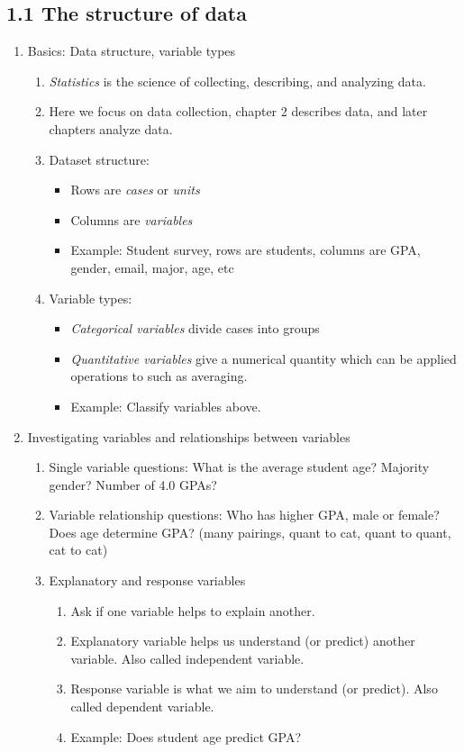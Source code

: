 \documentclass{article}
\begin{document}
\subsection{1.1 The structure of data}
\begin{enumerate}
\item Basics: Data structure, variable types
\begin{enumerate}
\item \emph{Statistics} is the science of collecting, describing, and analyzing data.
\item Here we focus on data collection, chapter 2 describes data, and later chapters analyze data.
\item Dataset structure:
\begin{itemize}
\item Rows are \emph{cases} or \emph{units}
\item Columns are \emph{variables}
\item Example: Student survey, rows are students, columns are GPA, gender, email, major, age, etc
\end{itemize}
\item Variable types:
\begin{itemize}
\item \emph{Categorical variables} divide cases into groups
\item \emph{Quantitative variables} give a numerical quantity which can be applied operations to such as averaging.
\item Example: Classify variables above. 
\end{itemize}
\end{enumerate}

\item Investigating variables and relationships between variables
\begin{enumerate}
\item Single variable questions: What is the average student age? Majority gender? Number of 4.0 GPAs?
\item Variable relationship questions: Who has higher GPA, male or female? Does age determine GPA? (many pairings, quant to cat, quant to quant, cat to cat)
\item Explanatory and response variables
\begin{enumerate}
\item Ask if one variable helps to explain another.
\item Explanatory variable helps us understand (or predict) another variable. Also called independent variable.
\item Response variable is what we aim to understand (or predict). Also called dependent variable.
\item Example: Does student age predict GPA?
\end{enumerate}
\end{enumerate}

\end{enumerate}
\end{document}
